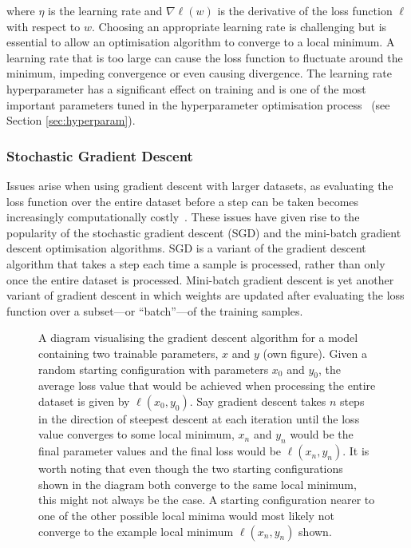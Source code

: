 \noindent
where $\eta$ is the learning rate and $\nabla\ell(w)$ is the derivative of the loss function $\ell$ with respect to $w$. Choosing an appropriate learning rate is challenging but is essential to allow an optimisation algorithm to converge to a local minimum. A learning rate that is too large can cause the loss function to fluctuate around the minimum, impeding convergence or even causing divergence. The learning rate hyperparameter has a significant effect on training and is one of the most important parameters tuned in the hyperparameter optimisation process~\cite{bengio2012practical} (see Section \ref{sec:hyperparam}).

\subsubsection{Stochastic Gradient Descent}

Issues arise when using gradient descent with larger datasets, as evaluating the loss function over the entire dataset before a step can be taken becomes increasingly computationally costly~\cite{gdbad}. These issues have given rise to the popularity of the stochastic gradient descent (SGD) and the mini-batch gradient descent optimisation algorithms. SGD is a variant of the gradient descent algorithm that takes a step each time a sample is processed, rather than only once the entire dataset is processed. Mini-batch gradient descent is yet another variant of gradient descent in which weights are updated after evaluating the loss function over a subset---or ``batch''---of the training samples.

\begin{figure}[t]
    \centering
    
    \caption{A diagram visualising the gradient descent algorithm for a model containing two trainable parameters, $x$ and $y$ (own figure). Given a random starting configuration with parameters $x_0$ and $y_0$, the average loss value that would be achieved when processing the entire dataset is given by $\ell(x_0, y_0)$. Say gradient descent takes $n$ steps in the direction of steepest descent at each iteration until the loss value converges to some local minimum, $x_n$ and $y_n$ would be the final parameter values and the final loss would be $\ell(x_n, y_n)$. It is worth noting that even though the two starting configurations shown in the diagram both converge to the same local minimum, this might not always be the case. A starting configuration nearer to one of the other possible local minima would most likely not converge to the example local minimum $\ell(x_n, y_n)$ shown.}
    \label{fig:gd}
\end{figure}

